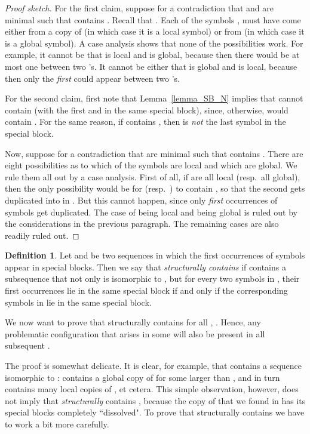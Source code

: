 \documentclass[11pt]{article}
\theoremstyle{definition}
\newtheorem{definition}[theorem]{Definition}
\theoremstyle{remark}
\begin{document}
\begin{proof}[Proof sketch]
For the first claim, suppose for a contradiction that  and  are minimal such that  contains . Recall that . Each of the symbols ,  must have come either from a copy of  (in which case it is a local symbol) or from  (in which case it is a global symbol). A case analysis shows that none of the possibilities work. For example, it cannot be that  is local and  is global, because then there would be at most one  between two 's. It cannot be either that  is global and  is local, because then only the \emph{first}  could appear between two 's.

For the second claim, first note that Lemma~\ref{lemma_SB_N} implies that  cannot contain  (with the first  and  in the same special block), since, otherwise,  would contain . For the same reason, if  contains , then  is \emph{not} the last symbol in the special block.

Now, suppose for a contradiction that  are minimal such that  contains . There are eight possibilities as to which of the symbols  are local and which are global. We rule them all out by a case analysis. First of all, if  are all local (resp.~all global), then the only possibility would be for  (resp.~) to contain , so that the second  gets duplicated into  in . But this cannot happen, since only \emph{first} occurrences of symbols get duplicated. The case of  being local and  being global is ruled out by the considerations in the previous paragraph. The remaining cases are also readily ruled out.
\end{proof}

\begin{definition}\label{def_structurally}
Let  and  be two sequences in which the first occurrences of symbols appear in special blocks. Then we say that  \emph{structurally contains}  if  contains a subsequence  that not only is isomorphic to , but for every two symbols in , their first occurrences lie in the same special block if and only if the corresponding symbols in  lie in the same special block.
\end{definition}

We now want to prove that  structurally contains  for all , . Hence, any problematic configuration that arises in some  will also be present in all subsequent .

The proof is somewhat delicate. It is clear, for example, that  contains a sequence isomorphic to :  contains a global copy of  for some  larger than , and in turn  contains many local copies of , et cetera. This simple observation, however, does not imply that  \emph{structurally} contains , because the copy of  that we found in  has its special blocks completely ``dissolved". To prove that  structurally contains  we have to work a bit more carefully.
\end{document}
